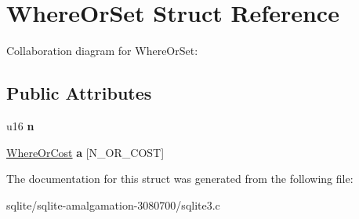 \hypertarget{struct_where_or_set}{\section{Where\+Or\+Set Struct Reference}
\label{struct_where_or_set}
}


Collaboration diagram for Where\+Or\+Set\+:
\subsection*{Public Attributes}
\begin{DoxyCompactItemize}
\item 
\hypertarget{struct_where_or_set_ac5fce5cb06eb3e01a77efe6643acd618}{u16 {\bfseries n}}\label{struct_where_or_set_ac5fce5cb06eb3e01a77efe6643acd618}

\item 
\hypertarget{struct_where_or_set_a2e78a14bf6f34f266a2ae2d046c7ba80}{\hyperlink{struct_where_or_cost}{Where\+Or\+Cost} {\bfseries a} \mbox{[}N\+\_\+\+O\+R\+\_\+\+C\+O\+S\+T\mbox{]}}\label{struct_where_or_set_a2e78a14bf6f34f266a2ae2d046c7ba80}

\end{DoxyCompactItemize}


The documentation for this struct was generated from the following file\+:\begin{DoxyCompactItemize}
\item 
sqlite/sqlite-\/amalgamation-\/3080700/sqlite3.\+c\end{DoxyCompactItemize}
